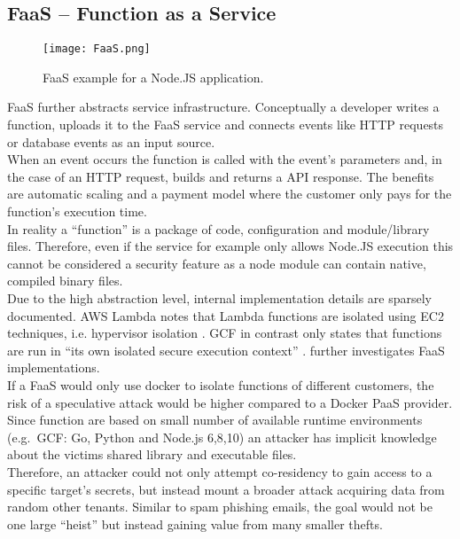 \documentclass[conference,compsoc,final,a4paper]{IEEEtran}
\begin{document}
\subsection{\acs{FaaS} -- Function as a Service}
\begin{figure}[!ht]
\centering
\texttt{[image: FaaS.png]}
\caption{\ac{FaaS} example for a Node.JS application.}
\label{virtmem}
\end{figure}
\acs{FaaS} further abstracts service infrastructure. Conceptually a developer writes a function, uploads it to the \acs{FaaS} service and connects events like HTTP requests or
database events as an input source. \\
When an event occurs the function is called with the event's parameters and, in the case of an HTTP request, builds and
returns a API response. The benefits are automatic scaling and a payment model where the customer only pays for the function's execution time. \cite{lambdaFeatures}\\
In reality a \enquote{function} is a package of code, configuration and module/library files. Therefore, even if the service for example only allows Node.JS execution
this cannot be considered a security feature as a node module can contain native, compiled binary files. \cite{lambdaFaq} \\
Due to the high abstraction level, internal implementation details are sparsely documented. \ac{AWS} Lambda notes that Lambda functions are isolated using EC2 techniques, i.e.
hypervisor isolation \cite{lambdaFaq}. \ac{GCF} in contrast only states that functions are run in
\enquote{its own isolated secure execution context} \cite{cloudFunc}. \textcite{wang2018peeking} further investigates \acs{FaaS} implementations. \\
If a \acs{FaaS} would only use docker to isolate functions of different customers, the risk of a speculative attack would be higher compared to a Docker \ac{PaaS} provider. Since function are based on small number of available runtime environments (e.g.\ \ac{GCF}: Go, Python and Node.js 6,8,10) \cite{cloudFunc} an attacker has implicit knowledge
about the victims shared library and executable files. \\
Therefore, an attacker could not only attempt co-residency to gain access to a specific target's secrets, but instead mount a broader attack acquiring data from random
other tenants. Similar to spam phishing emails, the goal would not be one large \enquote{heist} but instead gaining value from many smaller thefts.
\end{document}
